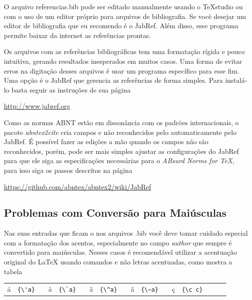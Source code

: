 \begin{apendicesenv}
    O arquivo {\color{red} referencias.bib} pode ser editado manualmente usando o
    TeXstudio ou com o uso de um editor próprio para arquivos de bibliografia.
    Se você desejar um editor de bibliografia que eu recomendo é o JabRef.
    Além disso, esse programa permite baixar da internet as referências prontas.

    Os arquivos com as referências bibliográficas tem uma formatação rígida e pouco intuitiva, gerando resultados inesperados em muitos casos. Uma forma de evitar erros na digitação desses arquivos é usar um programa específico para esse fim. Uma opção é o JabRef que gerencia as referências de forma simples. Para instalá-lo basta seguir as instruções de sua página
    \begin{center}
        \url{http://www.jabref.org}
    \end{center}

    Como as normas ABNT estão em dissonância com os padrões internacionais,
    o pacote \textit{abntex2cite} cria campos e não reconhecidos pelo automaticamente
    pelo JabRef.
    É possível fazer as edições a mão quando os campos não são reconhecidos,
    porém, pode ser mais simples ajustar as configurações do JabRef para que
    ele siga as especificações necessárias para o \textit{ABsurd Norms for TeX},
    para isso siga os passos descritos na página
    \begin{center}
        \url{https://github.com/abntex/abntex2/wiki/JabRef}
    \end{center}

    \subsection{Problemas com Conversão para Maiúsculas}

    Nas suas entradas que ficam o nos arquivos {\color{red} .bib}
    você deve tomar cuidado especial com a formatação dos acentos,
    especialmente no campo \textit{author} que sempre é convertido para maiúsculas.
    Nesses casos é recomendável utilizar a acentuação original do \LaTeX{}
    usando comandos e não letras acentuadas, como mostra a tabela

    \begin{center}
        \begin{tabular}{clcclcclcclcclccl}
            á & \verb!{\'a}! &  &
            à & \verb!{\`a}! &  &
            â & \verb!{\^a}! &  &
            ã & \verb!{\~a}! &  &
            ç & \verb!{\c c}!
        \end{tabular}
    \end{center}


\end{apendicesenv}

